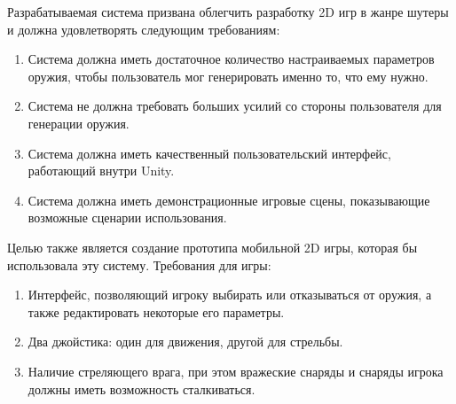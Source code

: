 Разрабатываемая система призвана облегчить разработку 2D игр в жанре шутеры и должна удовлетворять следующим требованиям:
\begin{enumerate}
    \item Система должна иметь достаточное количество настраиваемых параметров оружия, чтобы пользователь мог генерировать именно то, что ему нужно.
    \item Система не должна требовать больших усилий со стороны пользователя для генерации оружия.
    \item Система должна иметь качественный пользовательский интерфейс, работающий внутри Unity.
    \item Система должна иметь демонстрационные игровые сцены, показывающие возможные сценарии использования.
\end{enumerate}

\vspace{5mm}

Целью также является создание прототипа мобильной 2D игры, которая бы использовала эту систему. Требования для игры:
\begin{enumerate}
    \item Интерфейс, позволяющий игроку выбирать или отказываться от оружия, а также редактировать некоторые его параметры.
    \item Два джойстика: один для движения, другой для стрельбы.
    \item Наличие стреляющего врага, при этом вражеские снаряды и снаряды игрока должны иметь возможность сталкиваться.
\end{enumerate}

\pagebreak





